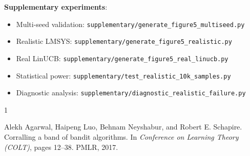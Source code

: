 \textbf{Supplementary experiments}:
\begin{itemize}
    \item Multi-seed validation: \texttt{supplementary/generate\_figure5\_multiseed.py}
    \item Realistic LMSYS: \texttt{supplementary/generate\_figure5\_realistic.py}
    \item Real LinUCB: \texttt{supplementary/generate\_figure5\_real\_linucb.py}
    \item Statistical power: \texttt{supplementary/test\_realistic\_10k\_samples.py}
    \item Diagnostic analysis: \texttt{supplementary/diagnostic\_realistic\_failure.py}
\end{itemize}


\begin{thebibliography}{1}

Alekh Agarwal, Haipeng Luo, Behnam Neyshabur, and Robert E. Schapire.
\newblock Corralling a band of bandit algorithms.
\newblock In \emph{Conference on Learning Theory (COLT)}, pages 12--38. PMLR, 2017.

\end{thebibliography}
